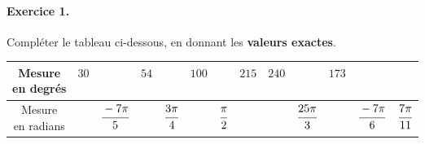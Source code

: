 \documentclass[11pt]{article}
\begin{document}

%

\paragraph{Exercice 1.}
Compléter le tableau ci-dessous, en donnant les \textbf{valeurs exactes}.
\def\arraystretch{2}
\begin{center}
\begin{tabular}{|c|c|c|c|c|c|c|c|c|c|c|c|c|}
  \hline
  \makecell{Mesure\\en degrés} & $30$ & & $54$ &  & $100$ & \phantom{$180$} &
  $215$ & $240$ & & $173$ & & \\
  \hline
  \makecell{Mesure\\en radians} & & $\cfrac{-7\pi}{5}$ & & $\cfrac{3\pi}{4}$ & &
  $\cfrac{\pi}{2}$ & & & $\cfrac{25\pi}{3}$ & & $\cfrac{-7\pi}{6}$ &
  $\cfrac{7\pi}{11}$\\
  \hline
\end{tabular}
\end{center}
\end{document}
